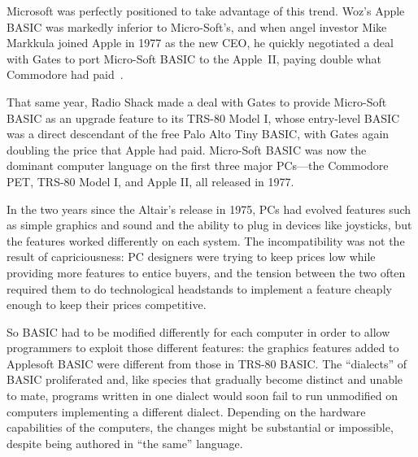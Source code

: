 
Microsoft was perfectly positioned to take advantage of this trend.
Woz's Apple BASIC was markedly inferior to Micro-Soft's, and when
angel investor Mike
Markkula joined Apple in 1977 as the new CEO, he
quickly negotiated a deal with Gates to port Micro-Soft BASIC to
the Apple~II, paying double what Commodore had
paid~\cite[p. 114]{commodore}.

That same year, Radio Shack made a deal with Gates to provide Micro-Soft
BASIC as an upgrade feature to its TRS-80 Model I, whose entry-level BASIC
was a direct descendant of the free Palo Alto Tiny BASIC, with Gates
again doubling the price that Apple had paid.
Micro-Soft BASIC was now the dominant computer language on the first
three major PCs---the Commodore PET, TRS-80 Model I, and Apple II, all
released in 1977.



In the two years since the Altair's release in 1975, PCs had evolved 
features such as simple graphics
and sound and the ability to plug in devices like joysticks, but the
features worked differently on each system.  The incompatibility was not
the result of capriciousness: PC designers were trying to keep prices
low while providing more features to entice buyers, and the tension
between the two often required them to do technological headstands to
implement a feature cheaply enough to keep their prices competitive.

So BASIC had to be modified differently for each computer in order to
allow programmers to exploit those different features: the graphics
features added to Applesoft BASIC were different from those in TRS-80
BASIC.
The ``dialects'' of BASIC proliferated and, like species that
gradually become distinct and unable to mate, programs written in one
dialect would soon fail to run unmodified on computers implementing a
different dialect.
Depending on the hardware capabilities of the computers, the changes
might be substantial or impossible, despite being authored in ``the
same'' language.

